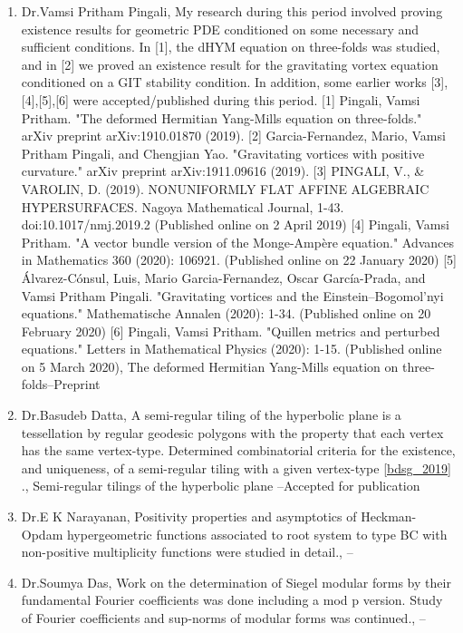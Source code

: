 \begin{enumerate}
\item Dr.Vamsi Pritham Pingali, My research during this period involved proving existence results for geometric PDE conditioned on some necessary and sufficient conditions. In [1], the dHYM equation on three-folds was studied, and in [2] we proved an existence result for the gravitating vortex equation conditioned on a GIT stability condition. In addition, some earlier works [3],[4],[5],[6] were accepted/published during this period.  [1] Pingali, Vamsi Pritham. "The deformed Hermitian Yang-Mills equation on three-folds." arXiv preprint arXiv:1910.01870 (2019). [2] Garcia-Fernandez, Mario, Vamsi Pritham Pingali, and Chengjian Yao. "Gravitating vortices with positive curvature." arXiv preprint arXiv:1911.09616 (2019). [3] PINGALI, V., & VAROLIN, D. (2019). NONUNIFORMLY FLAT AFFINE ALGEBRAIC HYPERSURFACES. Nagoya Mathematical Journal, 1-43. doi:10.1017/nmj.2019.2 (Published online on 2 April  2019) [4] Pingali, Vamsi Pritham. "A vector bundle version of the Monge-Ampère equation." Advances in Mathematics 360 (2020): 106921. (Published online on 22 January 2020) [5] Álvarez-Cónsul, Luis, Mario Garcia-Fernandez, Oscar García-Prada, and Vamsi Pritham Pingali. "Gravitating vortices and the Einstein–Bogomol’nyi equations." Mathematische Annalen (2020): 1-34. (Published online on 20 February 2020) [6] Pingali, Vamsi Pritham. "Quillen metrics and perturbed equations." Letters in Mathematical Physics (2020): 1-15. (Published online on 5 March 2020), The deformed Hermitian Yang-Mills equation on three-folds--Preprint
\item Dr.Basudeb Datta, A semi-regular tiling of the hyperbolic plane is a tessellation by regular geodesic polygons with the property that each vertex has the same vertex-type. Determined combinatorial criteria for the existence, and uniqueness, of a semi-regular tiling with a given vertex-type \ref{bdsg_2019} ., Semi-regular tilings of the hyperbolic plane \label{bdsg_2019}--Accepted for publication
\item Dr.E K Narayanan, Positivity properties and asymptotics of Heckman-Opdam hypergeometric functions associated to root system to type BC with non-positive multiplicity functions were studied in detail., --
\item Dr.Soumya Das, Work on the determination of Siegel modular forms by their fundamental Fourier coefficients was done including a mod p version. Study of Fourier coefficients and sup-norms of modular forms was continued., --

\end{enumerate}
